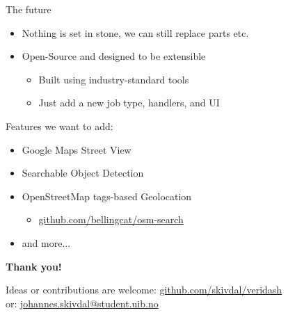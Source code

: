 \documentclass{beamer}
\begin{document}
  \begin{frame}{The future}
    \begin{itemize}
      \item Nothing is set in stone, we can still replace parts etc.
      \item {
        Open-Source and designed to be extensible
        \begin{itemize}
          \item Built using industry-standard tools
          \item Just add a new job type, handlers, and UI
        \end{itemize}
      }
    \end{itemize}

    Features we want to add:
    \begin{itemize}
      \item Google Maps Street View
      \item Searchable Object Detection
      \item {
        OpenStreetMap tags-based Geolocation
        \begin{itemize}
          \item \href{https://github.com/bellingcat/osm-search}{github.com/bellingcat/osm-search}
        \end{itemize}
      }
      \item and more...
    \end{itemize}
  \end{frame}

  \begin{frame}
    \centering
    \textbf{Thank you!}

    Ideas or contributions are welcome: \href{https://github.com/skivdal/veridash}{github.com/skivdal/veridash} \\
    or: \href{mailto:johannes.skivdal@student.uib.no}{johannes.skivdal@student.uib.no}
  \end{frame}
\end{document}
